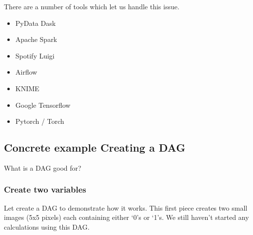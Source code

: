 \documentclass[letterpaper,10pt,english]{sphinxmanual}
\begin{document}
\sphinxAtStartPar
There are a number of tools which let us handle this issue.
\begin{itemize}
\item {} 
\sphinxAtStartPar
PyData Dask \sphinxhyphen{} 

\item {} 
\sphinxAtStartPar
Apache Spark \sphinxhyphen{} 

\item {} 
\sphinxAtStartPar
Spotify Luigi \sphinxhyphen{} 

\item {} 
\sphinxAtStartPar
Airflow \sphinxhyphen{} 

\item {} 
\sphinxAtStartPar
KNIME \sphinxhyphen{} 

\item {} 
\sphinxAtStartPar
Google Tensorflow \sphinxhyphen{} 

\item {} 
\sphinxAtStartPar
Pytorch / Torch \sphinxhyphen{} 

\end{itemize}


\subsection{Concrete example \sphinxhyphen{} Creating a DAG}
\label{\detokenize{01-Introduction:concrete-example-creating-a-dag}}
\sphinxAtStartPar
What is a DAG good for?


\subsubsection{Create two variables}
\label{\detokenize{01-Introduction:create-two-variables}}
\sphinxAtStartPar
Let create a DAG to demonstrate how it works. This first piece creates two small images (5x5 pixels) each containing either ‘0’s or ‘1’s. We still haven’t started any calculations using this DAG.
\end{document}
